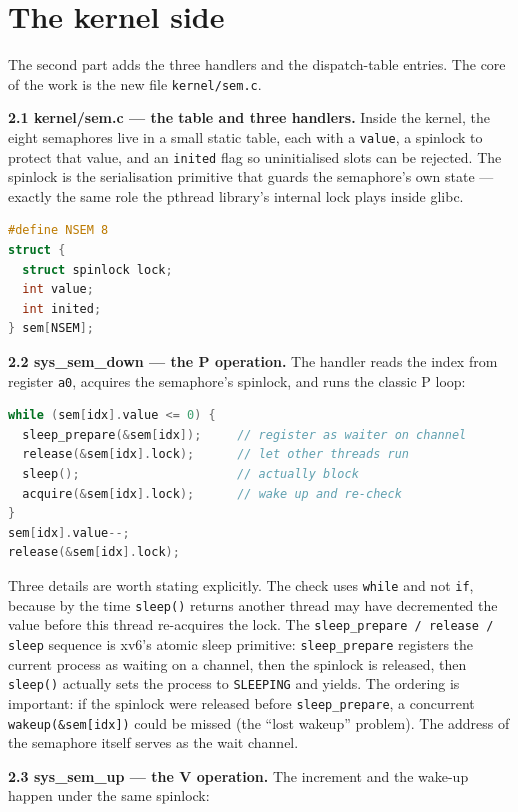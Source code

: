 \documentclass[12pt,a4paper]{article}
\begin{document}
\section{The kernel side}

The second part adds the three handlers and the dispatch-table entries. The core of the work is the new file \texttt{kernel/sem.c}.

\textbf{2.1 kernel/sem.c --- the table and three handlers.} Inside the kernel, the eight semaphores live in a small static table, each with a \texttt{value}, a spinlock to protect that value, and an \texttt{inited} flag so uninitialised slots can be rejected. The spinlock is the serialisation primitive that guards the semaphore's own state --- exactly the same role the pthread library's internal lock plays inside glibc.

\begin{lstlisting}[language=C]
#define NSEM 8
struct {
  struct spinlock lock;
  int value;
  int inited;
} sem[NSEM];
\end{lstlisting}

\textbf{2.2 sys\_sem\_down --- the P operation.} The handler reads the index from register \texttt{a0}, acquires the semaphore's spinlock, and runs the classic P loop:

\begin{lstlisting}[language=C]
while (sem[idx].value <= 0) {
  sleep_prepare(&sem[idx]);     // register as waiter on channel
  release(&sem[idx].lock);      // let other threads run
  sleep();                      // actually block
  acquire(&sem[idx].lock);      // wake up and re-check
}
sem[idx].value--;
release(&sem[idx].lock);
\end{lstlisting}

Three details are worth stating explicitly. The check uses \texttt{while} and not \texttt{if}, because by the time \texttt{sleep()} returns another thread may have decremented the value before this thread re-acquires the lock. The \texttt{sleep\_prepare / release / sleep} sequence is xv6's atomic sleep primitive: \texttt{sleep\_prepare} registers the current process as waiting on a channel, then the spinlock is released, then \texttt{sleep()} actually sets the process to \texttt{SLEEPING} and yields. The ordering is important: if the spinlock were released before \texttt{sleep\_prepare}, a concurrent \texttt{wakeup(\&sem[idx])} could be missed (the ``lost wakeup'' problem). The address of the semaphore itself serves as the wait channel.

\textbf{2.3 sys\_sem\_up --- the V operation.} The increment and the wake-up happen under the same spinlock:
\end{document}
